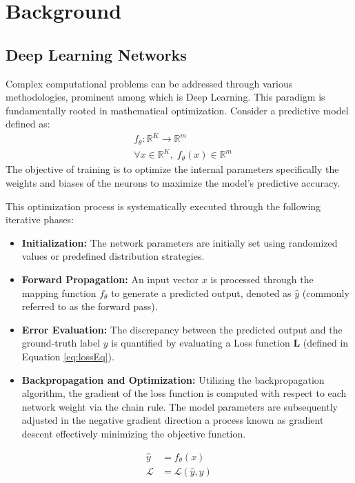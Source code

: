 \section{Background}\label{sec:background}

\subsection{Deep Learning Networks}
Complex computational problems can be addressed through various methodologies, prominent among which is Deep Learning. This paradigm is fundamentally rooted in mathematical optimization. Consider a predictive model defined as:
\begin{equation}
\begin{aligned}
  & f_{\theta} : \mathbb{R}^{K} \to \mathbb{R}^{m} \\
  &\forall x \in \mathbb{R}^K, \; f_{\theta}(x) \in \mathbb{R}^m
\end{aligned}
\label{eq:deeplearningmain}
\end{equation}
The objective of training is to optimize the internal parameters specifically the weights and biases of the neurons to maximize the model's predictive accuracy. 

This optimization process is systematically executed through the following iterative phases:
\begin{itemize}
  \item \textbf{Initialization:} The network parameters are initially set using randomized values or predefined distribution strategies.
  \item \textbf{Forward Propagation:} An input vector $x$ is processed through the mapping function $f_{\theta}$ to generate a predicted output, denoted as $\hat{y}$ (commonly referred to as the forward pass).
  \item \textbf{Error Evaluation:} The discrepancy between the predicted output and the ground-truth label $y$ is quantified by evaluating a Loss function $\mathbf{L}$ (defined in Equation \ref{eq:lossEq}).
  \item \textbf{Backpropagation and Optimization:} Utilizing the backpropagation algorithm, the gradient of the loss function is computed with respect to each network weight via the chain rule. The model parameters are subsequently adjusted in the negative gradient direction a process known as gradient descent effectively minimizing the objective function.
\end{itemize}

\begin{equation}
\begin{aligned}
  \hat{y} &= f_{\theta}(x) \\
  \mathcal{L} &= \mathcal{L}(\hat{y}, y)
\end{aligned}
\label{eq:lossEq}
\end{equation}

